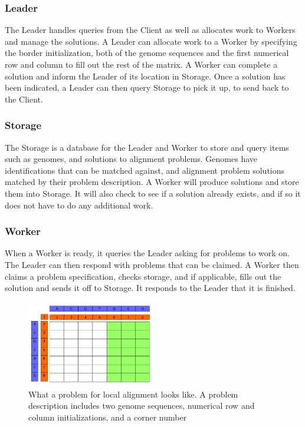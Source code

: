 \documentclass[12pt]{article}
\begin{document}
\subsubsection{Leader}
The Leader handles queries from the Client as well as allocates work to Workers and manage the solutions. A Leader can allocate work to a Worker by specifying the border initialization, both of the genome sequences and the first numerical row and column to fill out the rest of the matrix. A Worker can complete a solution and inform the Leader of its location in Storage. Once a solution has been indicated, a Leader can then query Storage to pick it up, to send back to the Client. 

\subsubsection{Storage}
The Storage is a database for the Leader and Worker to store and query items such as genomes, and solutions to alignment problems. Genomes have identifications that can be matched against, and alignment problem solutions matched by their problem description. 
A Worker will produce solutions and store them into Storage. It will also check to see if a solution already exists, and if so it does not have to do any additional work.

\subsubsection{Worker}
When a Worker is ready, it queries the Leader asking for problems to work on. The Leader can then respond with problems that can be claimed. A Worker then claims a problem specification, checks storage, and if applicable, fills out the solution and sends it off to Storage. It responds to the Leader that it is finished.



\begin{figure}
  \centering 
  \includegraphics[width=0.5\textwidth]{problem2}
  \caption{What a problem for local alignment looks like. A problem description includes two genome sequences, numerical row and column initializations, and a corner number}
  \label{fig:problem}
\end{figure}
\end{document}
